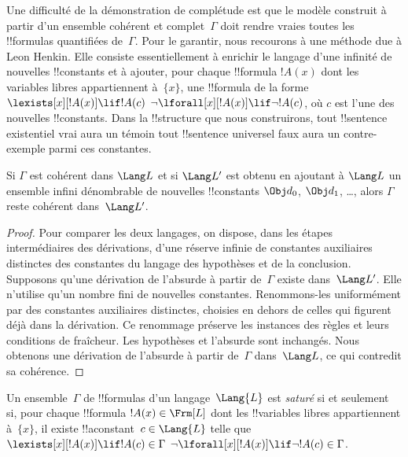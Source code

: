 \documentclass[../../../include/open-logic-section]{subfiles}
\begin{document}


\begin{explain}
Une difficulté de la démonstration de complétude est que le modèle
construit à partir d'un ensemble cohérent et complet~$\Gamma$ doit
rendre vraies toutes les !!{formula}s quantifiées de~$\Gamma$.
Pour le garantir, nous recourons à une méthode due à Leon Henkin.
Elle consiste essentiellement à enrichir le langage d'une infinité
de nouvelles !!{constant}s et à ajouter, pour chaque !!{formula}
$!A(x)$ dont les variables libres appartiennent à~$\{x\}$, une
!!{formula} de la forme
      {$\lexists[x][!A(x)] \lif !A(c)$}
      {$\lnot\lforall[x][!A(x)] \lif \lnot !A(c)$},
où $c$ est l'une des nouvelles !!{constant}s. Dans la !!{structure}
que nous construirons,
{tout !!{sentence} existentiel vrai aura un témoin}
{tout !!{sentence} universel faux aura un contre-exemple}
parmi ces constantes.
\end{explain}

\begin{prop}
Si $\Gamma$ est cohérent dans $\Lang L$ et si $\Lang L'$ est obtenu
en ajoutant à $\Lang L$ un ensemble infini dénombrable de nouvelles
!!{constant}s $\Obj d_0$, $\Obj d_1$, \dots, alors $\Gamma$ reste
cohérent dans~$\Lang L'$.
\end{prop}

\begin{proof}
Pour comparer les deux langages, on dispose, dans les étapes
intermédiaires des dérivations, d'une réserve infinie de constantes
auxiliaires distinctes des constantes du langage des hypothèses
et de la conclusion. Supposons qu'une dérivation de l'absurde
à partir de~$\Gamma$ existe dans~$\Lang L'$. Elle n'utilise qu'un
nombre fini de nouvelles constantes. Renommons-les uniformément
par des constantes auxiliaires distinctes, choisies en dehors
de celles qui figurent déjà dans la dérivation. Ce renommage
préserve les instances des règles et leurs conditions de fraîcheur.
Les hypothèses et l'absurde sont inchangés. Nous obtenons une
dérivation de l'absurde à partir de~$\Gamma$ dans~$\Lang L$,
ce qui contredit sa cohérence.
\end{proof}

\begin{defn}
Un ensemble~$\Gamma$ de !!{formula}s d'un langage~$\Lang{L}$ est
\emph{saturé} si et seulement si, pour chaque !!{formula}
$!A(x)\in\Frm[L]$ dont les !!{variable}s libres appartiennent
à~$\{x\}$, il existe !!a{constant}~$c\in\Lang{L}$ telle que
      {$\lexists[x][!A(x)] \lif !A(c) \in \Gamma$}
      {$\lnot\lforall[x][!A(x)] \lif \lnot !A(c) \in \Gamma$}.
\end{defn}
\end{document}
